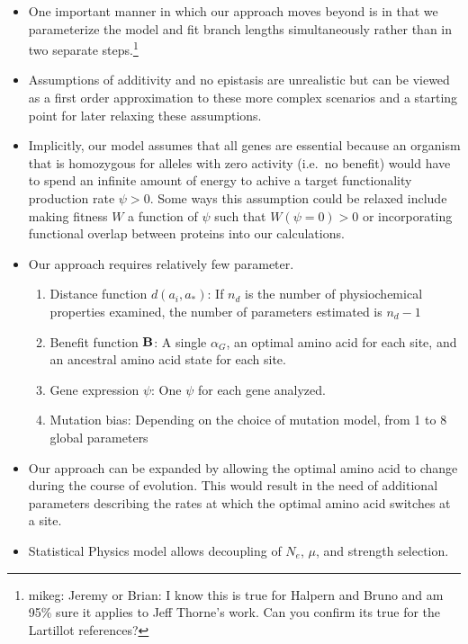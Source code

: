 \documentclass{article}
\newcommand{\Func}{\ensuremath{\text{\textbf{B}}}\xspace}
\newcommand{\Ne}{\ensuremath{{N_e}}\xspace} %
\newcommand{\aopt}{\ensuremath{a_*}\xspace}
\begin{document}
\begin{itemize}
\item One important manner in which our approach moves beyond \citet{HalpernAndBruno1998,RobinsonEtAl2003,LartillotAndPhilippe2004,ThorneEtAl2012,RodrigueAndLartillot2014} is in that we parameterize the model and fit branch lengths simultaneously rather than in two separate steps.\footnote{mikeg: Jeremy or Brian: I know this is true for Halpern and Bruno and am 95\% sure it applies to Jeff Thorne's work.
Can you confirm its true for the Lartillot references?}
\item Assumptions of additivity and no epistasis are unrealistic but can be viewed as a first order approximation to these more complex scenarios and a starting point for later relaxing these assumptions.
\item Implicitly, our model assumes that all genes are essential because an organism that is homozygous for alleles with zero activity (i.e.~no benefit) would have to spend an infinite amount of energy to achive a target functionality production rate $\psi > 0$.
  Some ways this assumption could be relaxed include making fitness $W$ a function of $\psi$ such that  $W(\psi = 0) > 0$ or incorporating functional overlap between proteins into our calculations.
\item Our approach requires relatively few parameter. 
  \begin{enumerate}
  \item Distance function $d(a_i, \aopt)$: If $n_d$ is the number of physiochemical properties examined, the number of parameters estimated is $n_d - 1$
  \item Benefit function $\Func$: A single $\alpha_G$, an optimal amino acid for each site, and an ancestral amino acid state for each site. 
  \item Gene expression $\psi$: One $\psi$ for each gene analyzed.
  \item Mutation bias: Depending on the choice of mutation model, from 1 to 8 global parameters 
  \end{enumerate}
\item Our approach can be expanded by allowing the optimal amino acid to change during the course of evolution.
This would result in the need of additional parameters describing the rates at which the optimal amino acid switches at a site.
\item Statistical Physics model allows decoupling of \Ne, $\mu$, and strength selection.
\end{itemize}
\end{document}
